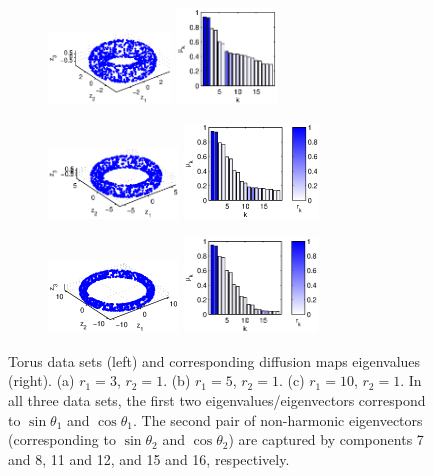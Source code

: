 \documentclass[preprint]{elsarticle}
\begin{document}
\begin{figure}[t]
%
\begin{subfigure}{0.3\textwidth}
\includegraphics[height=0.75in]{torus1}
\includegraphics[height=1in]{torus1_evals}
\caption{}
\end{subfigure}
%
\begin{subfigure}{0.32\textwidth}
\includegraphics[height=0.75in]{torus2}
\includegraphics[height=1in]{torus2_evals}
\caption{}
\end{subfigure}
%
\begin{subfigure}{0.35\textwidth}
\includegraphics[height=0.75in]{torus3}
\includegraphics[height=1in]{torus3_evals}
\caption{}
\end{subfigure}
%
\caption{Torus data sets (left) and corresponding diffusion maps eigenvalues (right). (a) $r_1 = 3$, $r_2 = 1$. (b) $r_1 = 5$, $r_2 = 1$. (c) $r_1 = 10$, $r_2 = 1$. In all three data sets, the first two eigenvalues/eigenvectors correspond to $\sin \theta_1$ and $\cos \theta_1$. The second pair of non-harmonic eigenvectors (corresponding to $\sin \theta_2$ and $\cos \theta_2$) are captured by components 7 and 8, 11 and 12, and 15 and 16, respectively.}
%
\label{fig:torus}
%
\end{figure}
\end{document}
